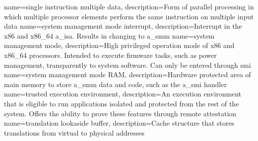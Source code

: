 {
    name={single instruction multiple data},
    description={Form of parallel processing in which multiple processor elements perform the same instruction on
            multiple input data}
}
{
    name=system management mode interrupt,
    description={Interrupt in the x86 and x86\_64 \acrshort{a_isa}. Results in changing to \acrshort{a_smm}}
}
{
    name=system management mode,
    description={High privileged operation mode of x86 and x86\_64 processors. Intended to execute firmware tasks, such
            as power management, transparently to system software. Can only be entered through \acrshort{smi}}
}
{
    name=system management mode RAM,
    description={Hardware protected area of main memory to store \acrshort{a_smm} data and code, such as the
            \acrshort{a_smi} handler}
}
%
{
    name=trusted execution environment,
    description={An execution environment that is eligible to run applications isolated and protected from the rest of
            the system. Offers the ability to prove these features through remote attestation}
}
{
    name=translation lookaside buffer,
    description={Cache structure that stores translations from virtual to physical addresses}
}
